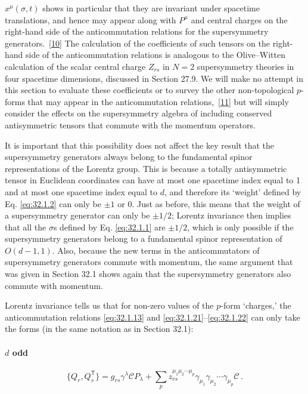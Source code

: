 \(x^\mu(\sigma,t)\) shows in particular that they are invariant under
spacetime translations, and hence may appear along with \(P^\mu\) and
central charges on the right-hand side of the anticommutation relations
for the supersymmetry generators.~\hyperref[ch32-ref-10]{[10]} The
calculation of the coefficients of such tensors on the right-hand side of
the anticommutation relations is analogous to the Olive--Witten
calculation of the scalar central charge \(Z_{rs}\) in \(N=2\)
supersymmetry theories in four spacetime dimensions, discussed in Section
27.9. We will make no attempt in this section to evaluate these
coefficients or to survey the other non-topological \(p\)-forms that may
appear in the anticommutation relations,~\hyperref[ch32-ref-11]{[11]} but
will simply consider the effects on the supersymmetry algebra of including
conserved antisymmetric tensors that commute with the momentum operators.

It is important that this possibility does not affect the key result that
the supersymmetry generators always belong to the fundamental spinor
representations of the Lorentz group. This is because a totally
antisymmetric tensor in Euclidean coordinates can have at most one
spacetime index equal to 1 and at most one spacetime index equal to \(d\),
and therefore its `weight' defined by Eq. \eqref{eq:32.1.2} can only be
\(\pm1\) or 0. Just as before, this means that the weight of a
supersymmetry generator can only be \(\pm1/2\); Lorentz invariance then
implies that all the \(\sigma\)s defined by Eq. \eqref{eq:32.1.1} are
\(\pm1/2\), which is only possible if the supersymmetry generators belong
to a fundamental spinor representation of \(O(d-1,1)\). Also, because the
new terms in the anticommutators of supersymmetry generators commute with
momentum, the same argument that was given in Section 32.1 shows again
that the supersymmetry generators also commute with momentum.

Lorentz invariance tells us that for non-zero values of the \(p\)-form
`charges,' the anticommutation relations \eqref{eq:32.1.13} and
\eqref{eq:32.1.21}--\eqref{eq:32.1.22} can only take the forms (in the
same notation as in Section 32.1):

\paragraph{\(d\) odd}
\begin{equation}
  \{Q_r,Q_s^{\mathsf T}\}
  =g_{rs}\gamma^\lambda\mathcal C P_\lambda
   +\sum_p z_{rs}^{\mu_1\mu_2\cdots\mu_p}
    \gamma_{\mu_1}\gamma_{\mu_2}\cdots\gamma_{\mu_p}\mathcal C\,.
  \tag{32.3.2}\label{eq:32.3.2}
\end{equation}

